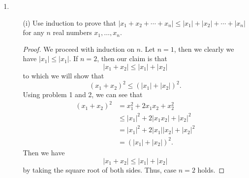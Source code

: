 \documentclass{article}
\begin{document}
\begin{enumerate}
\begin{proof}
        \( (\Leftarrow) \) Suppose \( -d \leq c \leq d  \). Note that if \( c = 0  \), then the result immediately follows. Thus, we either have \( c > 0  \) or \( c < 0  \). If \( c > 0  \), then \( | c  |  = c  \). Then by assumption, we have
        \[  | c |  = c \leq d. \]
        If \( c < 0  \), then \( | c  |  = -c  \). By assumption, we see that 
        \[  -d \leq c \implies -c \leq d. \]
        Thus, we have
        \[ | c  | = -c \leq d.   \]
    \end{proof}
    \item 
        \begin{enumerate}
            \item[(i)] Use induction to prove that \( | {x}_{1} + {x}_{2} + \cdots + {x}_{n} |  \leq | {x}_{1}  |  + | {x}_{2}  |  + \cdots + | {x}_{n} | \) for any \( n  \) real numbers \( {x}_{1}, \dots, {x}_{n} \).
                \begin{proof}
                We proceed with induction on \( n  \). Let \( n = 1  \), then we clearly we have \( | {x}_{1} |  \leq | {x}_{1} |  \). If \( n = 2  \), then our claim is that  
                \[  | {x}_{1} + {x}_{2} | \leq | {x}_{1} | + | {x}_{2} | \]
                to which we will show that 
                \[  ({x}_{1} + {x}_{2})^{2} \leq (| {x}_{1} |  + | {x}_{2}| )^{2}.  \]
                Using problem 1 and 2, we can see that
                \begin{align*}
                    ({x}_{1} + {x}_{2})^{2} &= {x}_{1}^{2} + 2 {x}_{1} {x}_{2} + {x}_{2}^{2} \\
                                            &\leq | {x}_{1} |^{2} + 2 | {x}_{1} {x}_{2} | + | {x}_{2} |^{2} \\
                                            &= | {x}_{1} |^{2} + 2 | {x}_{1} | | {x}_{2} |  + | {x}_{2} |^{2} \\
                                            &= (| {x}_{1} |  + | {x}_{2} | )^{2}.
                \end{align*}
                Then we have
                \[  | {x}_{1} + {x}_{2} | \leq | {x}_{1} | + | {x}_{2} |  \]
                by taking the square root of both sides. Thus, case \( n = 2  \) holds. 


\end{proof}
\end{enumerate}
\end{enumerate}
\end{document}
